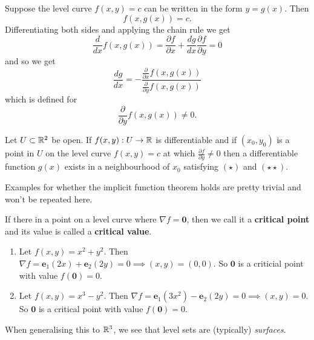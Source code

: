 
Suppose the level curve $f(x, y) = c$ can be written in the form $y = g(x)$. Then 
\[f(x, g(x)) = c. \tag{$\star$} \] 
Differentiating both sides and applying the chain rule we get
\[ \frac{d}{dx} f(x, g(x)) = \frac{\partial f}{\partial x} + \frac{dg}{dx} \frac{\partial f}{\partial y} = 0 \]
and so we get
\[ \frac{dg}{dx} = -\frac{\frac{\partial}{\partial x}f(x, g(x))}{\frac{\partial}{\partial y}f(x, g(x))} \tag{$\star\star$} \]
which is defined for 
\[ \frac{\partial}{\partial y} f(x, g(x)) \neq 0. \]

\begin{theorem}
    Let $U \subset \mathbb{R}^2$ be open. If $f(x, y): U \to \mathbb{R}$ is differentiable and if $(x_0, y_0)$ is a point in $U$ on the level curve $f(x, y) = c$ at which $\frac{\partial f}{\partial y} \neq 0$ then a differentiable function $g(x)$ exists in a neighbourhood of $x_0$ satisfying $(\star)$ and $(\star\star)$.
\end{theorem}

Examples for whether the implicit function theorem holds are pretty trivial and won't be repeated here.

\begin{definition}
    If there in a point on a level curve where $\nabla f = \bm 0$, then we call it a \textbf{critical point} and its value is called a \textbf{critical value}.
\end{definition}

\begin{example}
    \begin{enumerate}
        \item Let $f(x, y) = x^2 + y^2$. 
            Then $\nabla f = \bm e_1 (2x) + \bm e_2  (2y) = 0 \implies (x, y) = (0,0)$.
            So $\bm 0$ is a criticial point with value $f(\bm 0) = 0$.
        \item Let $f(x, y) = x^3 - y^2$. 
            Then $\nabla f = \bm e_1(3x^2) - \bm e_2(2y)= 0 \implies (x, y) = 0$.
            So $\bm 0$ is a critical point with value $f(\bm 0) = 0$.
    \end{enumerate}
\end{example}

When generalising this to $\mathbb{R}^3$, we see that level sets are (typically) \emph{surfaces}.

